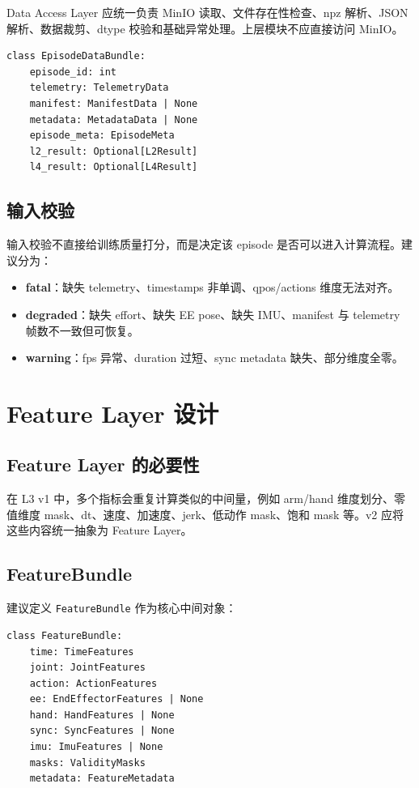 \documentclass[UTF8,zihao=-4,oneside,openany]{ctexrep}
\newcommand{\Code}[1]{\texttt{#1}}
\newcommand{\Term}[1]{\textbf{#1}}
\begin{document}
Data Access Layer 应统一负责 MinIO 读取、文件存在性检查、npz 解析、JSON 解析、数据裁剪、dtype 校验和基础异常处理。上层模块不应直接访问 MinIO。

\begin{verbatim}
class EpisodeDataBundle:
    episode_id: int
    telemetry: TelemetryData
    manifest: ManifestData | None
    metadata: MetadataData | None
    episode_meta: EpisodeMeta
    l2_result: Optional[L2Result]
    l4_result: Optional[L4Result]
\end{verbatim}

\subsection{输入校验}

输入校验不直接给训练质量打分，而是决定该 episode 是否可以进入计算流程。建议分为：

\begin{itemize}
\item \Term{fatal}：缺失 telemetry、timestamps 非单调、qpos/actions 维度无法对齐。
\item \Term{degraded}：缺失 effort、缺失 EE pose、缺失 IMU、manifest 与 telemetry 帧数不一致但可恢复。
\item \Term{warning}：fps 异常、duration 过短、sync metadata 缺失、部分维度全零。
\end{itemize}

\section{Feature Layer 设计}

\subsection{Feature Layer 的必要性}

在 L3 v1 中，多个指标会重复计算类似的中间量，例如 arm/hand 维度划分、零值维度 mask、dt、速度、加速度、jerk、低动作 mask、饱和 mask 等。v2 应将这些内容统一抽象为 Feature Layer。

\subsection{FeatureBundle}

建议定义 \Code{FeatureBundle} 作为核心中间对象：

\begin{verbatim}
class FeatureBundle:
    time: TimeFeatures
    joint: JointFeatures
    action: ActionFeatures
    ee: EndEffectorFeatures | None
    hand: HandFeatures | None
    sync: SyncFeatures | None
    imu: ImuFeatures | None
    masks: ValidityMasks
    metadata: FeatureMetadata
\end{verbatim}
\end{document}

